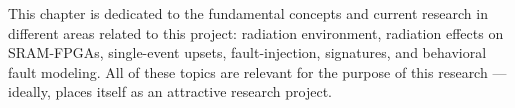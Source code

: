 

This chapter is dedicated to the fundamental concepts and current research in different areas related to this project: radiation environment, radiation effects on SRAM-FPGAs, single-event upsets, fault-injection, signatures,  and behavioral fault modeling. All of these topics are relevant for the purpose of this research --- ideally, places itself as an attractive research project.








